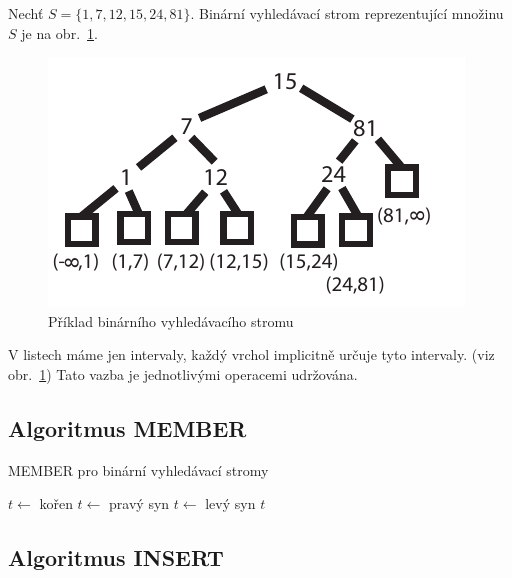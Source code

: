 \begin{priklad}
Nechť $S = \{ 1, 7, 12, 15, 24, 81 \}$. Binární vyhledávací strom
reprezentující množinu $S$ je na obr.~\ref{fig.bvs.example}.

\begin{figure}[!htb]
\centering\includegraphics{pics/bvs}
\caption{Příklad binárního vyhledávacího stromu}
\label{fig.bvs.example}
\end{figure}

\end{priklad}

\begin{pozn}
V listech máme jen intervaly, každý vrchol implicitně určuje tyto
intervaly. (viz obr.~\ref{fig.bvs.example}) Tato vazba je jednotlivými
operacemi udržována.
\end{pozn}

\subsection{Algoritmus MEMBER}

\begin{algorithm}[!htb]
\caption{MEMBER pro binární vyhledávací stromy}
\label{alg:btr.mem}
\begin{algorithmic}
\STATE $t \leftarrow$ kořen
  \STATE $t \leftarrow$ pravý syn
\ELSE 
   \STATE $t \leftarrow$ levý syn $t$
\ENDIF
\ENDWHILE
\end{algorithmic}
\end{algorithm}


\subsection{Algoritmus INSERT}

